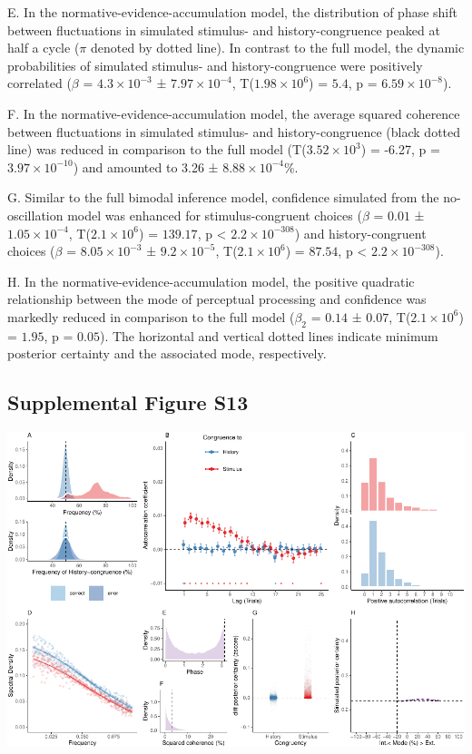 \documentclass[
]{article}
\begin{document}
E. In the normative-evidence-accumulation model, the distribution of
phase shift between fluctuations in simulated stimulus- and
history-congruence peaked at half a cycle (\(\pi\) denoted by dotted
line). In contrast to the full model, the dynamic probabilities of
simulated stimulus- and history-congruence were positively correlated
(\(\beta\) = \(\ensuremath{4.3\times 10^{-3}}\) ±
\(\ensuremath{7.97\times 10^{-4}}\),
T(\(\ensuremath{1.98\times 10^{6}}\)) = \(5.4\), p =
\(\ensuremath{6.59\times 10^{-8}}\)).

F. In the normative-evidence-accumulation model, the average squared
coherence between fluctuations in simulated stimulus- and
history-congruence (black dotted line) was reduced in comparison to the
full model (T(\ensuremath{3.52\times 10^{3}}) = -6.27, p =
\(\ensuremath{3.97\times 10^{-10}}\)) and amounted to 3.26 ±
\ensuremath{8.88\times 10^{-4}}\%.

G. Similar to the full bimodal inference model, confidence simulated
from the no-oscillation model was enhanced for stimulus-congruent
choices (\(\beta\) = \(0.01\) ± \(\ensuremath{1.05\times 10^{-4}}\),
T(\(\ensuremath{2.1\times 10^{6}}\)) = \(139.17\), p < \(\ensuremath{2.2\times 10^{-308}}\)) and
history-congruent choices (\(\beta\) =
\(\ensuremath{8.05\times 10^{-3}}\) ±
\(\ensuremath{9.2\times 10^{-5}}\), T(\(\ensuremath{2.1\times 10^{6}}\))
= \(87.54\), p < \(\ensuremath{2.2\times 10^{-308}}\)).

H. In the normative-evidence-accumulation model, the positive quadratic
relationship between the mode of perceptual processing and confidence
was markedly reduced in comparison to the full model (\(\beta_2\) =
\(0.14\) ± \(0.07\), T(\(\ensuremath{2.1\times 10^{6}}\)) = \(1.95\), p
= \(0.05\)). The horizontal and vertical dotted lines indicate minimum
posterior certainty and the associated mode, respectively.

\newpage

\hypertarget{supplemental-figure-s13}{%
\subsection{Supplemental Figure S13}\label{supplemental-figure-s13}}

\includegraphics{modes_mouse_rev1b_files/figure-latex/Supplemental_Figure_13-1.pdf}
\end{document}
